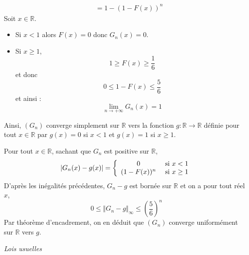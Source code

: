 \documentclass[a4paper,10pt]{report}
\begin{document}
\begin{enumerate}
\begin{align*}
 & = 1-(1- F(x))^n 
\end{align*}
Soit $x \in \mathbb{R}$.
\begin{itemize}
\item Si $x<1$ alors $F(x)=0$ donc $G_n(x)=0$.
\item Si $x \geq 1$, 
$$1 \geq F(x) \geq \dfrac{1}{6}$$
et donc 
$$ 0 \leq 1- F(x) \leq \dfrac{5}{6}$$
et ainsi :
$$ \lim_{n \rightarrow + \infty} G_n(x) =1$$
\end{itemize}
Ainsi, $(G_n)$ converge simplement sur $\mathbb{R}$ vers la fonction $g : \mathbb{R} \rightarrow \mathbb{R}$ définie pour tout $x \in \mathbb{R}$ par $g(x) = 0$ si $x<1$ et $g(x)=1$ si $x \geq 1$. 

\noindent Pour tout $x \in \mathbb{R}$, sachant que $G_n$ est positive sur $\mathbb{R}$,
$$ \vert G_n(x) -g(x) \vert = \left\lbrace \begin{array}{cl}
0& \hbox{ si } x < 1 \\
(1-F(x))^n & \hbox{ si } x \geq 1  \\
\end{array}\right.$$
D'après les inégalités précédentes,  $G_n-g$ est bornée sur $\mathbb{R}$ et on a pour tout réel $x$,
$$0 \leq \Vert G_n -g \Vert_{\infty} \leq \left( \dfrac{5}{6} \right)^n$$
Par théorème d'encadrement, on en déduit que $(G_n)$ converge uniformément sur $\mathbb{R}$ vers $g$.


\end{enumerate}

\newpage

\medskip

\begin{center}
\textit{{ {\large Lois usuelles}}}
\end{center}

\medskip
\end{document}
